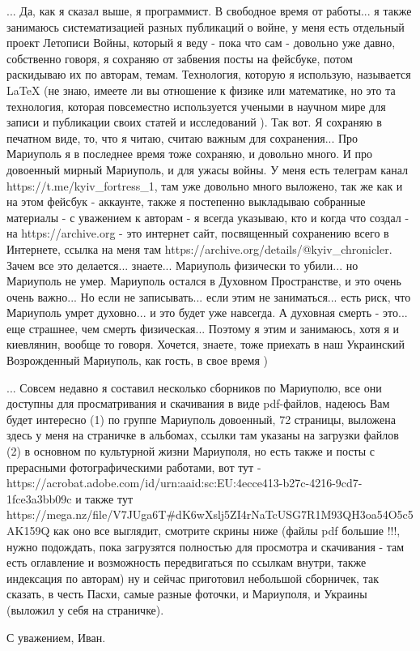 ... Да, как я сказал выше, я программист. В свободное время от работы... я
также занимаюсь систематизацией разных публикаций о войне, у меня есть
отдельный проект Летописи Войны, который я веду - пока что сам - довольно уже
давно, собственно говоря, я сохраняю от забвения посты на фейсбуке, потом
раскидываю их по авторам, темам. Технология, которую я использую, называется
LaTeX (не знаю, имеете ли вы отношение к физике или математике, но это та
технология, которая повсеместно используется учеными в научном мире для записи
и публикации своих статей и исследований ). Так вот.  Я сохраняю в печатном
виде, то, что я читаю, считаю важным для сохранения...  Про Мариуполь я в
последнее время тоже сохраняю, и довольно много. И про довоенный мирный
Мариуполь, и для ужасы войны. У меня есть телеграм канал
https://t.me/kyiv_fortress_1, там уже довольно много выложено, так же как и на
этом фейсбук - аккаунте, также я постепенно выкладываю собранные  материалы - с
уважением к авторам - я всегда указываю, кто и когда что создал - на
https://archive.org - это интернет сайт, посвященный сохранению всего в
Интернете, ссылка на меня там https://archive.org/details/@kyiv_chronicler.
Зачем все это делается... знаете... Мариуполь физически то убили... но
Мариуполь не умер. Мариуполь остался в Духовном Пространстве, и это очень очень
важно... Но если не записывать... если этим не заниматься... есть риск, что
Мариуполь умрет духовно... и это будет уже навсегда. А духовная смерть - это...
еще страшнее, чем смерть физическая... Поэтому я этим и занимаюсь, хотя я и
киевлянин, вообще то говоря. Хочется, знаете, тоже приехать в наш Украинский
Возрожденный Мариуполь, как гость, в свое время ) 

... Совсем недавно я составил несколько сборников по Мариуполю, все они
доступны для просматривания и скачивания в виде pdf-файлов, надеюсь Вам будет
интересно (1) по группе Мариуполь довоенный, 72 страницы, выложена здесь у меня
на страничке в альбомах, ссылки там указаны на загрузки файлов (2) в основном
по культурной жизни Мариуполя, но есть также и посты с прерасными
фотографическими работами, вот тут -
https://acrobat.adobe.com/id/urn:aaid:sc:EU:4ecce413-b27c-4216-9cd7-1fce3a3bb09c
и также тут
https://mega.nz/file/V7JUga6T#dK6wXslj5ZI4rNaTcUSG7R1M93QH3oa54O5c5AK159Q как
оно все выглядит, смотрите скрины ниже (файлы pdf большие !!!, нужно подождать,
пока загрузятся полностью для просмотра и скачивания - там есть оглавление и
возможность передвигаться по ссылкам внутри, также индексация по авторам) ну и
сейчас приготовил небольшой сборничек, так сказать, в честь Пасхи, самые разные
фоточки, и Мариуполя, и Украины (выложил у себя на страничке).

С уважением, Иван.
